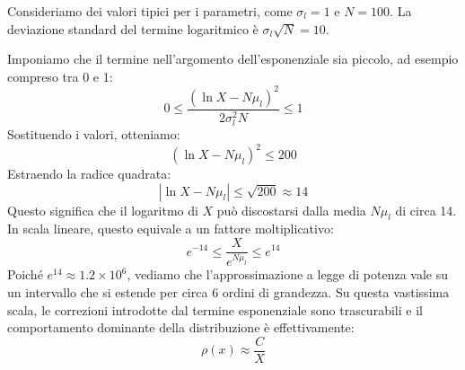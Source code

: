 Consideriamo dei valori tipici per i parametri, come $\sigma_{l} = 1$ e $N=100$. La deviazione standard del termine logaritmico è $\sigma_{l}\sqrt{N} = 10$.

Imponiamo che il termine nell'argomento dell'esponenziale sia piccolo, ad esempio compreso tra 0 e 1:
$$ 0 \le \frac{(\ln X - N\mu_{l})^2}{2\sigma_{l}^2 N} \le 1 $$
Sostituendo i valori, otteniamo:
$$ (\ln X - N\mu_{l})^2 \le 200 $$
Estraendo la radice quadrata:
$$ |\ln X - N\mu_{l}| \le \sqrt{200} \approx 14 $$
Questo significa che il logaritmo di $X$ può discostarsi dalla media $N\mu_{l}$ di circa 14. In scala lineare, questo equivale a un fattore moltiplicativo:
$$ e^{-14} \le \frac{X}{e^{N\mu_{l}}} \le e^{14} $$
Poiché $e^{14} \approx 1.2 \times 10^6$, vediamo che l'approssimazione a legge di potenza vale su un intervallo che si estende per circa 6 ordini di grandezza. Su questa vastissima scala, le correzioni introdotte dal termine esponenziale sono trascurabili e il comportamento dominante della distribuzione è effettivamente:
$$ \rho(x) \approx \frac{C}{X} $$


